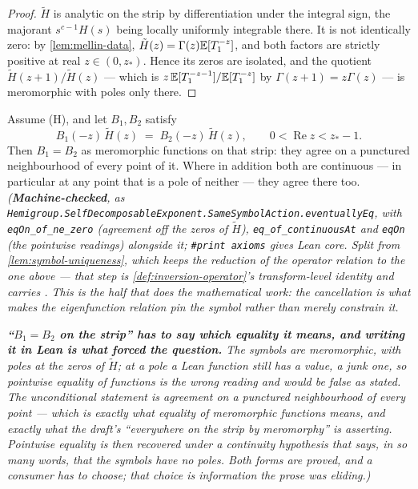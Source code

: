 \begin{proof}
\leanok
{}
$\tilde H$ is analytic on the strip by differentiation under the integral sign, the majorant
$s^{c-1}H(s)$ being locally uniformly integrable there. It is not identically zero: by
\ref{lem:mellin-data}, $\tilde H(z) = \Gamma(z)\mathbb{E}[T_1^{-z}]$, and both factors are strictly
positive at real $z \in (0, z_*)$. Hence its zeros are isolated, and the quotient
$\tilde H(z+1)/\tilde H(z)$ --- which is $z\,\mathbb{E}[T_1^{-z-1}]/\mathbb{E}[T_1^{-z}]$ by
$\Gamma(z+1) = z\Gamma(z)$ --- is meromorphic with poles only there.
\end{proof}


\begin{lemma}\label{lem:symbol-rigidity}
\leanok
Assume (H), and let $B_1, B_2$ satisfy
\[
  B_1(-z)\,\tilde H(z) \;=\; B_2(-z)\,\tilde H(z),
  \qquad 0 < \operatorname{Re} z < z_* - 1 .
\]
Then $B_1 = B_2$ as meromorphic functions on that strip: they agree on a punctured neighbourhood
of every point of it. Where in addition both are continuous --- in particular at any point that
is a pole of neither --- they agree there too.
\statusT\quad\emph{(\textbf{Machine-checked}, as
\texttt{Hemigroup.SelfDecomposableExponent.SameSymbolAction.eventuallyEq}, with
\texttt{eqOn\_of\_ne\_zero} (agreement off the zeros of $\tilde H$), \texttt{eq\_of\_continuousAt}
and \texttt{eqOn} (the pointwise readings) alongside it; \texttt{\#print axioms} gives
Lean core. Split from \ref{lem:symbol-uniqueness}, which keeps the reduction
of the operator relation to the one above --- that step is \ref{def:inversion-operator}'s
transform-level identity and carries . This is the half that does the mathematical
work: the cancellation is what makes the eigenfunction relation \emph{pin} the symbol rather than
merely constrain it.}

\emph{\textbf{``$B_1 = B_2$ on the strip'' has to say which equality it means, and writing it in
Lean is what forced the question.} The symbols are meromorphic, with poles at the zeros of
$\tilde H$; at a pole a Lean function still has a value, a junk one, so pointwise equality of
functions is the wrong reading and would be false as stated. The unconditional statement is
agreement on a punctured neighbourhood of every point --- which is exactly what equality of
meromorphic functions means, and exactly what the draft's ``everywhere on the strip by
meromorphy'' is asserting. Pointwise equality is then recovered under a continuity hypothesis
that says, in so many words, that the symbols have no poles. Both forms are proved, and a
consumer has to choose; that choice is information the prose was eliding.)}
\end{lemma}

